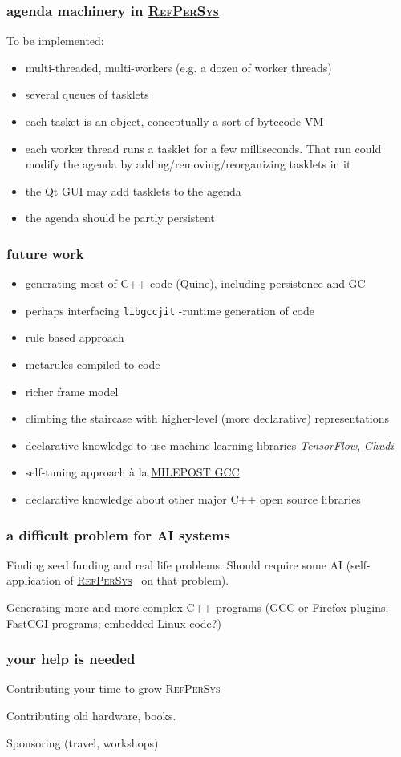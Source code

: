 \documentclass[xcolor=svgnames,final,smaller,a4]{beamer}
\newcommand{\RefPerSys}{\href{http://refpersys.org}{\textsc{RefPerSys}}}
\begin{document}
  \begin{frame}
    \frametitle{agenda machinery in \RefPerSys}

    To be implemented:
    
    \begin{itemize}
    \item multi-threaded, multi-workers (e.g. a dozen of worker threads)
    \item several queues of tasklets
    \item each tasket is an object, conceptually a sort of bytecode VM
    \item each worker thread runs a tasklet for a few milliseconds. That run could modify the agenda by adding/removing/reorganizing tasklets in it
    \item the Qt GUI may add tasklets to the agenda
      \item the agenda should be partly persistent
    \end{itemize}
  \end{frame}

  \begin{frame}
    \frametitle{future work}
    \begin{itemize}
    \item generating most of C++ code (Quine), including persistence and GC
    \item perhaps interfacing \texttt{libgccjit}  -runtime generation of code
    \item rule based approach
    \item metarules compiled to code
    \item richer frame model
    \item climbing the staircase with higher-level (more declarative) representations
    \item declarative knowledge to use machine learning libraries
        \href{https://www.tensorflow.org/}{\textit{TensorFlow}},
        \href{http://gudhi.gforge.inria.fr/}{\textit{Ghudi}}
      \item self-tuning approach à la
        \href{https://en.wikipedia.org/wiki/MILEPOST\_GCC}{MILEPOST
          GCC}
      \item declarative knowledge about other major C++ open source libraries
    \end{itemize}
  \end{frame}
  
  \begin{frame}
    \frametitle{a difficult problem for AI systems}

    \medskip
    
    Finding seed funding and real life problems. Should require some AI (self-application of \RefPerSys~ on that problem).

    \bigskip
    
    Generating more and more complex C++ programs (GCC or Firefox plugins; FastCGI programs; embedded Linux code?)
    
  \end{frame}

  
  \begin{frame}
    \frametitle{your help is needed}

    Contributing your time to grow \RefPerSys

    Contributing old hardware, books.

    Sponsoring (travel, workshops)

    
  \end{frame}
  
\end{document}
